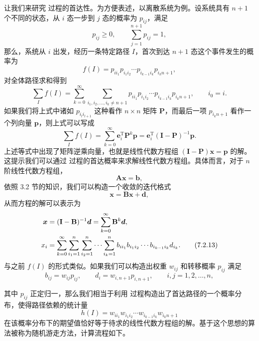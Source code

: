 让我们来研究  过程的首达性。为方便表述，以离散系统为例。设系统具有 $n+1$ 个不同的状态，从 $i$ 态一步到 $j$ 态的概率为 $p_{ij}$，满足
\begin{equation}
 p_{ij}\ge0,\qquad \sum_{j=1}^{n+1}p_{ij}=1,
\tag{7.2.7}
\end{equation}
那么，系统从 $i$ 出发，经历一条特定路径 $I$，首次到达 $n+1$ 态这个事件发生的概率为
\begin{equation}
 f(I)=p_{ii_1}p_{i_1i_2}\cdots p_{i_{k-1}i_k}p_{i_kn+1},
\tag{7.2.8}
\end{equation}
对全体路径求和得到
\begin{equation}
 \sum_I f(I)=\sum_{k=0}^{\infty}\sum_{i_1,i_2,\ldots,i_k\ne n+1}
 p_{ii_1}p_{i_1i_2}\cdots p_{i_{k-1}i_k}p_{i_kn+1},\qquad i_0=i.
\tag{7.2.9}
\end{equation}
如果我们将上式中诸如 $p_{i_li_{l+1}}$ 这种看作 $n\times n$ 矩阵 $\mathbf P$，而最后一项 $p_{i_kn+1}$ 看作一个列向量 $\bm p$，则上式可以写成
\begin{equation}
 \sum_I f(I)=\sum_{k=0}^{\infty}\bm e_i^{\mathrm T}\mathbf P^k\bm p
 =\bm e_i^{\mathrm T}(\mathbf I-\mathbf P)^{-1}\bm p.
\tag{7.2.10}
\end{equation}
上述等式中出现了矩阵逆乘向量，也就是线性代数方程组 $(\mathbf I-\mathbf P)\bm x=\bm p$ 的解。这提示我们可以通过  过程的首达概率来求解线性代数方程组。具体而言，对于 $n$ 阶线性代数方程组，
\begin{equation}
 \mathbf A\bm x=\bm b,
\tag{7.2.11}
\end{equation}
依照 3.2 节的知识，我们可以构造一个收敛的迭代格式
\begin{equation}
 \bm x=\mathbf B\bm x+\bm d,
\tag{7.2.12}
\end{equation}
从而方程的解可以表示为
\begin{align}
 \bm x&=(\mathbf I-\mathbf B)^{-1}\bm d=\sum_{k=0}^{\infty}\mathbf B^k\bm d,\notag\\
 x_i&=\sum_{k=0}^{\infty}\sum_{i_1=1}^{n}\sum_{i_2=1}^{n}\cdots\sum_{i_k=1}^{n}
 b_{ii_1}b_{i_1i_2}\cdots b_{i_{k-1}i_k}d_{i_k}.
\tag{7.2.13}
\end{align}
与之前 $f(I)$ 的形式类似。如果我们可以构造出权重 $w_{ij}$ 和转移概率 $p_{ij}$ 满足
\begin{equation}
 b_{ij}=w_{ij}p_{ij},\qquad d_i=w_{i,n+1}p_{i,n+1},\qquad i,j=1,2,\ldots,n,
\tag{7.2.14}
\end{equation}

其中 $p_{ij}$ 正定归一，那么我们相当于利用  过程构造出了首达路径的一个概率分布，使得路径依赖的统计量
\begin{equation}
 h(I)=w_{ii_1}w_{i_1i_2}\cdots w_{i_{k-1}i_k}w_{i_kn+1}
\tag{7.2.15}
\end{equation}
在该概率分布下的期望值恰好等于待求的线性代数方程组的解。基于这个思想的算法被称为随机游走方法，计算流程如下。

